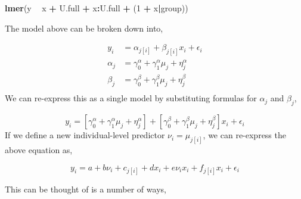 \documentclass[12pt,]{article}
\newenvironment{Shaded}{\begin{snugshade}}{\end{snugshade}}
\newcommand{\KeywordTok}[1]{\textcolor[rgb]{0.13,0.29,0.53}{\textbf{#1}}}
\newcommand{\DecValTok}[1]{\textcolor[rgb]{0.00,0.00,0.81}{#1}}
\newcommand{\StringTok}[1]{\textcolor[rgb]{0.31,0.60,0.02}{#1}}
\newcommand{\OperatorTok}[1]{\textcolor[rgb]{0.81,0.36,0.00}{\textbf{#1}}}
\newcommand{\NormalTok}[1]{#1}
\begin{document}
\begin{Shaded}
\begin{Highlighting}[]
\KeywordTok{lmer}\NormalTok{(y }\OperatorTok{~}\StringTok{ }\NormalTok{x }\OperatorTok{+}\StringTok{ }\NormalTok{U.full }\OperatorTok{+}\StringTok{ }\NormalTok{x}\OperatorTok{:}\NormalTok{U.full }\OperatorTok{+}\StringTok{ }\NormalTok{(}\DecValTok{1} \OperatorTok{+}\StringTok{ }\NormalTok{x}\OperatorTok{|}\NormalTok{group))}
\end{Highlighting}
\end{Shaded}

The model above can be broken down into,

\[
\begin{aligned}
y_i &= \alpha_{j[i]} + \beta_{j[i]}x_i + \epsilon_i\\
\alpha_j &= \gamma^\alpha_0 + \gamma_1^\alpha \mu_j + \eta^\alpha_j\\
\beta_j &= \gamma^\beta_0 + \gamma^\beta_1 \mu_j + \eta^\beta_j\\
\end{aligned}
\] We can re-express this as a single model by substituting formulas for
\(\alpha_j\) and \(\beta_j\),

\[y_i = [\gamma^\alpha_0 + \gamma_1^\alpha \mu_j + \eta^\alpha_j] + [\gamma^\beta_0 + \gamma^\beta_1 \mu_j + \eta^\beta_j]x_i + \epsilon_i\]
If we define a new individual-level predictor \(\nu_i = \mu_{j[i]}\), we
can re-express the above equation as,

\[y_i = a + b \nu_i + c_{j[i]} + dx_i + e\nu_ix_i + f_{j[i]}x_i + \epsilon_i\]

This can be thought of is a number of ways,
\end{document}
